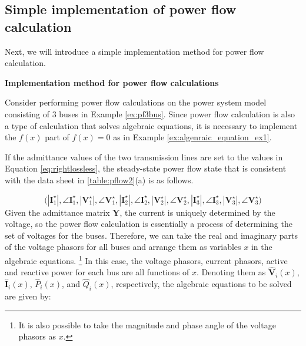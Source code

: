 \documentclass[graybox, envcountchap]{svmult}
\begin{document}
\subsection{Simple implementation of power flow calculation}

Next, we will introduce a simple implementation method for power flow
calculation.

\begin{example}{\textbf{Implementation method for power flow
calculations}}\label{ex:simplepowerflow}

Consider performing power flow calculations on the power system model consisting
of 3 buses in Example \ref{ex:pf3bus}. Since power flow calculation is also a
type of calculation that solves algebraic equations, it is necessary to
implement the $f(x)$ part of $f(x)=0$ as in Example
\ref{ex:algenraic_equation_ex1}.

If the admittance values of the two transmission lines are set to the values in
Equation \ref{eq:rightlossless}, the steady-state power flow state that is
consistent with the data sheet in \ref{table:pflow2}(a) is as follows.

\[
\bigl(
|\bm{I}_1^{\star}|,\angle \bm{I}_1^{\star},
|\bm{V}_1^{\star}|,\angle \bm{V}_1^{\star},
|\bm{I}_2^{\star}|,\angle \bm{I}_2^{\star},
|\bm{V}_2^{\star}|,\angle \bm{V}_2^{\star},
|\bm{I}_3^{\star}|,\angle \bm{I}_3^{\star},
|\bm{V}_3^{\star}|,\angle \bm{V}_3^{\star}
\bigr)
\]
Given the admittance matrix $\bm Y$, the current is uniquely determined by the
voltage, so the power flow calculation is essentially a process of determining
the set of voltages for the buses. Therefore, we can take the real and imaginary
parts of the voltage phasors for all buses and arrange them as variables $x$ in
the algebraic equations. \footnote{It is also possible to take the magnitude and
phase angle of the voltage phasors as $x$.} In this case, the voltage phasors,
current phasors, active and reactive power for each bus are all functions of
$x$. Denoting them as $\hat{\bm V}_i(x)$, $\hat{\bm I}_i(x)$, $\hat{P}_i(x)$,
and $\hat{Q}_i(x)$, respectively, the algebraic equations to be solved are given
by:


\end{example}
\end{document}
